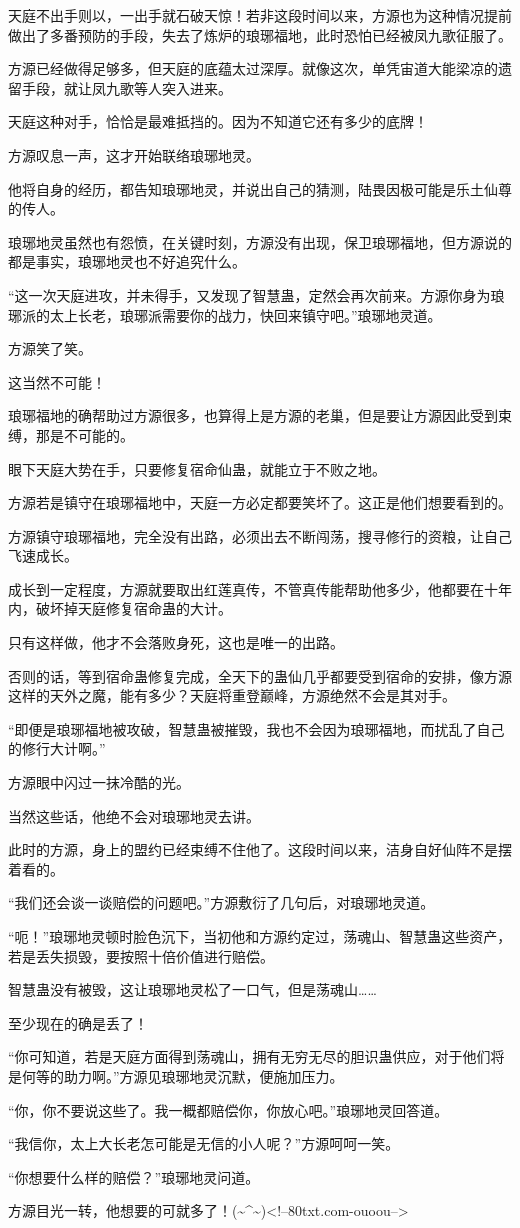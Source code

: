 \begin{this_body}
天庭不出手则以，一出手就石破天惊！若非这段时间以来，方源也为这种情况提前做出了多番预防的手段，失去了炼炉的琅琊福地，此时恐怕已经被凤九歌征服了。

方源已经做得足够多，但天庭的底蕴太过深厚。就像这次，单凭宙道大能梁凉的遗留手段，就让凤九歌等人突入进来。

天庭这种对手，恰恰是最难抵挡的。因为不知道它还有多少的底牌！

方源叹息一声，这才开始联络琅琊地灵。

他将自身的经历，都告知琅琊地灵，并说出自己的猜测，陆畏因极可能是乐土仙尊的传人。

琅琊地灵虽然也有怨愤，在关键时刻，方源没有出现，保卫琅琊福地，但方源说的都是事实，琅琊地灵也不好追究什么。

“这一次天庭进攻，并未得手，又发现了智慧蛊，定然会再次前来。方源你身为琅琊派的太上长老，琅琊派需要你的战力，快回来镇守吧。”琅琊地灵道。

方源笑了笑。

这当然不可能！

琅琊福地的确帮助过方源很多，也算得上是方源的老巢，但是要让方源因此受到束缚，那是不可能的。

眼下天庭大势在手，只要修复宿命仙蛊，就能立于不败之地。

方源若是镇守在琅琊福地中，天庭一方必定都要笑坏了。这正是他们想要看到的。

方源镇守琅琊福地，完全没有出路，必须出去不断闯荡，搜寻修行的资粮，让自己飞速成长。

成长到一定程度，方源就要取出红莲真传，不管真传能帮助他多少，他都要在十年内，破坏掉天庭修复宿命蛊的大计。

只有这样做，他才不会落败身死，这也是唯一的出路。

否则的话，等到宿命蛊修复完成，全天下的蛊仙几乎都要受到宿命的安排，像方源这样的天外之魔，能有多少？天庭将重登巅峰，方源绝然不会是其对手。

“即便是琅琊福地被攻破，智慧蛊被摧毁，我也不会因为琅琊福地，而扰乱了自己的修行大计啊。”

方源眼中闪过一抹冷酷的光。

当然这些话，他绝不会对琅琊地灵去讲。

此时的方源，身上的盟约已经束缚不住他了。这段时间以来，洁身自好仙阵不是摆着看的。

“我们还会谈一谈赔偿的问题吧。”方源敷衍了几句后，对琅琊地灵道。

“呃！”琅琊地灵顿时脸色沉下，当初他和方源约定过，荡魂山、智慧蛊这些资产，若是丢失损毁，要按照十倍价值进行赔偿。

智慧蛊没有被毁，这让琅琊地灵松了一口气，但是荡魂山……

至少现在的确是丢了！

“你可知道，若是天庭方面得到荡魂山，拥有无穷无尽的胆识蛊供应，对于他们将是何等的助力啊。”方源见琅琊地灵沉默，便施加压力。

“你，你不要说这些了。我一概都赔偿你，你放心吧。”琅琊地灵回答道。

“我信你，太上大长老怎可能是无信的小人呢？”方源呵呵一笑。

“你想要什么样的赔偿？”琅琊地灵问道。

方源目光一转，他想要的可就多了！(\~{}\^{}\~{})<!--80txt.com-ouoou-->

\end{this_body}


